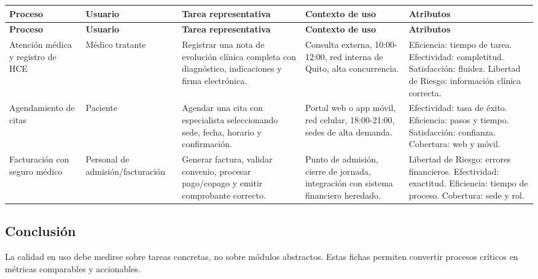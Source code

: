 \documentclass[11pt]{article}
\begin{document}
\small
\begin{longtable}{p{} p{} p{} p{} p{}}
\toprule
\textbf{Proceso} & \textbf{Usuario} & \textbf{Tarea representativa} & \textbf{Contexto de uso} & \textbf{Atributos} \\
\midrule
\endfirsthead
\toprule
\textbf{Proceso} & \textbf{Usuario} & \textbf{Tarea representativa} & \textbf{Contexto de uso} & \textbf{Atributos} \\
\midrule
\endhead
Atención médica y registro de HCE & Médico tratante & Registrar una nota de evolución clínica completa con diagnóstico, indicaciones y firma electrónica. & Consulta externa, 10:00-12:00, red interna de Quito, alta concurrencia. & Eficiencia: tiempo de tarea. Efectividad: completitud. Satisfacción: fluidez. Libertad de Riesgo: información clínica correcta. \\
Agendamiento de citas & Paciente & Agendar una cita con especialista seleccionando sede, fecha, horario y confirmación. & Portal web o app móvil, red celular, 18:00-21:00, sedes de alta demanda. & Efectividad: tasa de éxito. Eficiencia: pasos y tiempo. Satisfacción: confianza. Cobertura: web y móvil. \\
Facturación con seguro médico & Personal de admisión/facturación & Generar factura, validar convenio, procesar pago/copago y emitir comprobante correcto. & Punto de admisión, cierre de jornada, integración con sistema financiero heredado. & Libertad de Riesgo: errores financieros. Efectividad: exactitud. Eficiencia: tiempo de proceso. Cobertura: sede y rol. \\
\bottomrule
\end{longtable}
\normalsize

\subsection*{Conclusión}
La calidad en uso debe medirse sobre tareas concretas, no sobre módulos abstractos. Estas fichas permiten convertir procesos críticos en métricas comparables y accionables.
\end{document}
